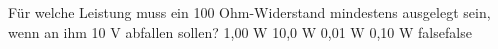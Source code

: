     {Für welche Leistung muss ein 100 Ohm-Widerstand mindestens ausgelegt sein, wenn an ihm 10 V abfallen sollen?}
    {1,00 W}
    {10,0 W}
    {0,01 W}
    {0,10 W}
    {false}{false}